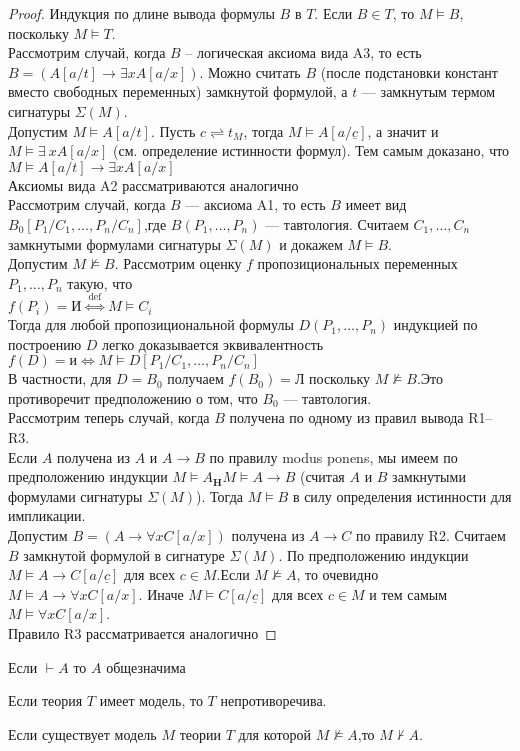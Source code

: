 \begin{proof}
Индукция по длине вывода формулы $B$ в $T$. Если $B\in T$, то $M\vDash B$, поскольку $M\vDash T$.\\\medskip 
Рассмотрим случай, когда $B$ -- логическая аксиома вида A3, то есть $B=(A[a / t] \rightarrow \exists x A[a / x])$. Можно считать $B$ (после подстановки констант вместо свободных переменных) замкнутой формулой, а $t$ — замкнутым термом сигнатуры $\Sigma(M)$.\\\medskip 
Допустим $M \vDash A[a / t]$. Пусть $c \rightleftharpoons t_{M}$, тогда $M \vDash A[a / \underline{c}]$, а значит и $M \vDash \exists\:x A[a/x]$ (см. определение истинности формул). Тем самым доказано, что $M \vDash A[a / t] \rightarrow \exists x A[a / x]$\\\medskip 
Аксиомы вида A2 рассматриваются аналогично\\
Рассмотрим случай, когда $B$ — аксиома A1, то есть $B$ имеет вид $B_{0}\left[P_{1} / C_{1}, \ldots, P_{n} / C_{n}\right]$,где $B(P_1,\dots,P_n)$ — тавтология. Считаем $C_1,\dots,C_n$ замкнутыми формулами сигнатуры $\Sigma(M)$ и докажем $M\vDash B$.\\\medskip 
Допустим $M\nvDash B$. Рассмотрим оценку $f$ пропозициональных переменных $P_1,\dots,P_n$ такую, что\\\medskip 
$f\left(P_{i}\right)=\text{И} \stackrel{\text { def }}{\Longleftrightarrow} M \vDash C_{i}$\\\medskip 
Тогда для любой пропозициональной формулы  $D(P_1,\dots,P_n)$ индукцией по построению $D$ легко доказывается эквивалентность\\
$f(D)=\text{и} \Longleftrightarrow M \vDash D\left[P_{1} / C_{1}, \ldots, P_{n} / C_{n}\right]$\\\medskip 
В частности, для $D=B_0$ получаем $f(B_0)=$Л поскольку $M\nvDash B$.Это противоречит предположению о том, что $B_0$ — тавтология.\\\medskip 
Рассмотрим теперь случай, когда $B$ получена по одному из правил вывода R1–R3.\\\medskip 
Если $A$ получена из $A$ и $A\rightarrow B$ по правилу modus ponens, мы имеем по предположению индукции $M \vDash A_{\mathbf{H}} M \vDash A \rightarrow B$ (считая $A$ и $B$ замкнутыми формулами сигнатуры $\Sigma(M)$). Тогда $M \vDash B$ в силу определения истинности для импликации.\\ \medskip 
Допустим $B=(A \rightarrow \forall x C[a / x])$ получена из $A \rightarrow C$ по правилу R2. Считаем $B$ замкнутой формулой в сигнатуре $\Sigma(M)$. По предположению индукции $M\vDash A\rightarrow C[a/\underline{c}]$ для всех $c\in M$.Если $M\nvDash A$, то очевидно $M \vDash A \rightarrow \forall x C[a / x]$.
Иначе $M\vDash C[a/\underline{c}]$ для всех $c\in M$ и тем самым $M \vDash \forall x C[a / x]$.\\\medskip 
Правило R3 рассматривается аналогично
\end{proof}
\begin{corollary}
    Если $\vdash A$ то $A$ общезначима
\end{corollary}
\begin{corollary}
    Если теория $T$ имеет модель, то $T$ непротиворечива.
\end{corollary}
\begin{corollary}
    Если существует модель $M$ теории $T$ для которой $M\nvDash A$,то $M\nvdash A$.
\end{corollary}